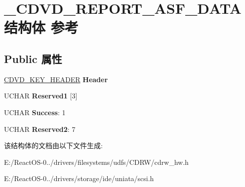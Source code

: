 \hypertarget{struct___c_d_v_d___r_e_p_o_r_t___a_s_f___d_a_t_a}{}\section{\+\_\+\+C\+D\+V\+D\+\_\+\+R\+E\+P\+O\+R\+T\+\_\+\+A\+S\+F\+\_\+\+D\+A\+T\+A结构体 参考}
\label{struct___c_d_v_d___r_e_p_o_r_t___a_s_f___d_a_t_a}
\subsection*{Public 属性}
\begin{DoxyCompactItemize}
\item 
\mbox{\label{struct___c_d_v_d___r_e_p_o_r_t___a_s_f___d_a_t_a_a1899a2e8ea9f06a34e6c07077bd0498b}} 
\hyperlink{struct___c_d_v_d___k_e_y___h_e_a_d_e_r}{C\+D\+V\+D\+\_\+\+K\+E\+Y\+\_\+\+H\+E\+A\+D\+ER} {\bfseries Header}
\item 
\mbox{\label{struct___c_d_v_d___r_e_p_o_r_t___a_s_f___d_a_t_a_afe782738ce389d82d8ee964b4d6cb1db}} 
U\+C\+H\+AR {\bfseries Reserved1} \mbox{[}3\mbox{]}
\item 
\mbox{\label{struct___c_d_v_d___r_e_p_o_r_t___a_s_f___d_a_t_a_a4f1416b9959e33951a47cb1b6de1f2c6}} 
U\+C\+H\+AR {\bfseries Success}\+: 1
\item 
\mbox{\label{struct___c_d_v_d___r_e_p_o_r_t___a_s_f___d_a_t_a_a1dd9419313b32b6687156f55cb95d3de}} 
U\+C\+H\+AR {\bfseries Reserved2}\+: 7
\end{DoxyCompactItemize}


该结构体的文档由以下文件生成\+:\begin{DoxyCompactItemize}
\item 
E\+:/\+React\+O\+S-\/0../drivers/filesystems/udfs/\+C\+D\+R\+W/cdrw\+\_\+hw.\+h\item 
E\+:/\+React\+O\+S-\/0../drivers/storage/ide/uniata/scsi.\+h\end{DoxyCompactItemize}
